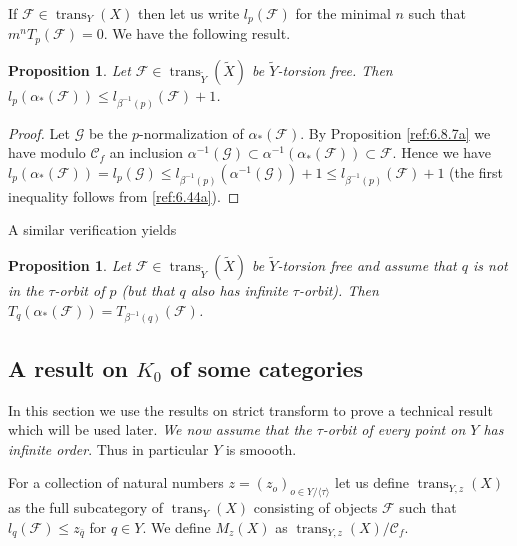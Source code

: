 \documentclass{amsproc}
\def\Cscr{{\mathcal C}}
\def\Fscr{{\mathcal F}}
\def\Gscr{{\mathcal G}}
\def\trans{\operatorname{trans}}
\newtheorem{propositions}[lemmas]{Proposition}
\theoremstyle{definition}
\theoremstyle{remark}
\numberwithin{equation}{section}
\numberwithin{table}{section}
\numberwithin{figure}{section}
\begin{document}
If $\Fscr\in\trans_Y(X)$ then let us write $l_p(\Fscr)$ for the minimal
$n$ such that $m^n T_p(\Fscr)=0$.
We have the following result.
\begin{propositions} 
\label{ref:6.8.8a}
Let $\Fscr\in \trans_{\tilde{Y}}(\tilde{X})$ be
  $\tilde{Y}$-torsion free.
Then 
  $l_p(\alpha_\ast(\Fscr))\le l_{\beta^{-1}(p)}(\Fscr)+1$. 
\end{propositions}
\begin{proof}
  Let $\Gscr$ be the $p$-normalization of $\alpha_\ast(\Fscr)$. By
  Proposition \ref{ref:6.8.7a} we have modulo $\Cscr_f$ an inclusion
  $\alpha^{-1}(\Gscr)\subset \alpha^{-1}(\alpha_\ast(\Fscr))\subset
  \Fscr$. Hence we have $l_p(\alpha_\ast(\Fscr))=l_p(\Gscr)\le
  l_{\beta^{-1}(p)}(\alpha^{-1} (\Gscr))+1\le
  l_{\beta^{-1}(p)}(\Fscr)+1 $ (the first inequality follows from
  \eqref{ref:6.44a}).
\end{proof}
A similar verification yields
\begin{propositions}
\label{ref:6.8.9a}
Let $\Fscr\in \trans_{\tilde{Y}}(\tilde{X})$ be $\tilde{Y}$-torsion
free and assume that $q$ is not in the $\tau$-orbit of $p$ (but that
$q$ also has infinite $\tau$-orbit). Then
$T_q(\alpha_\ast(\Fscr))=T_{\beta^{-1}(q)}(\Fscr)$. 
\end{propositions}

\subsection{A result on $K_0$ of some categories}
\label{ref:6.9b}
In this section we use the results on strict transform to prove a
technical result which will be used later. \emph{We now assume that
  the $\tau$-orbit of every point on $Y$ has infinite order}. Thus in
particular $Y$ is smoooth.

For a collection of natural numbers $z=(z_o)_{o\in Y/\langle\tau\rangle}$
let us define $\trans_{Y,z}(X)$ as the full subcategory of $\trans_Y(X)$
consisting of objects $\Fscr$ such that $l_q(\Fscr)\le z_{\bar{q}}$
for $q\in Y$. We
define $M_z(X)$ as $\trans_{Y,z}(X)/\Cscr_f$. 
\end{document}
